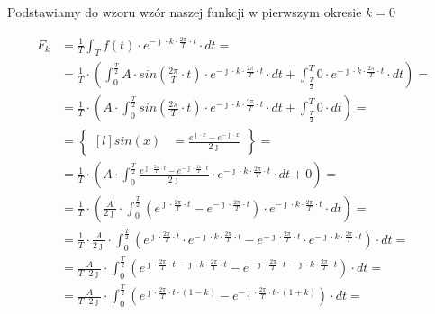 \begin{task}
Podstawiamy do wzoru wzór naszej funkcji w pierwszym okresie $k=0$

\begin{align*}
F_k&=\frac{1}{T}\int_{T}f(t) \cdot e^{-\jmath \cdot k \cdot \frac{2\pi}{T} \cdot t} \cdot dt=\\
&=\frac{1}{T}\cdot\left(\int_{0}^{\frac{T}{2}}A \cdot sin\left( \frac{2\pi}{T} \cdot t\right) \cdot e^{-\jmath \cdot k \cdot \frac{2\pi}{T} \cdot t} \cdot dt+\int_{\frac{T}{2}}^{T} 0 \cdot e^{-\jmath \cdot k \cdot \frac{2\pi}{T} \cdot t} \cdot dt\right)=\\
&=\frac{1}{T}\cdot\left(A \cdot \int_{0}^{\frac{T}{2}}sin\left( \frac{2\pi}{T} \cdot t\right) \cdot e^{-\jmath \cdot k \cdot \frac{2\pi}{T} \cdot t} \cdot dt+\int_{\frac{T}{2}}^{T} 0 \cdot dt\right)=\\
&=\begin{Bmatrix*}[l]
sin\left(x\right)&=\frac{e^{\jmath \cdot x}-e^{-\jmath \cdot x}}{2 \jmath }
\end{Bmatrix*}=\\
&=\frac{1}{T}\cdot\left(A \cdot \int_{0}^{\frac{T}{2}} \frac{e^{\jmath \cdot \frac{2\pi}{T} \cdot t}-e^{-\jmath \cdot \frac{2\pi}{T} \cdot t}}{2\jmath} \cdot e^{-\jmath \cdot k \cdot \frac{2\pi}{T} \cdot t} \cdot dt+0\right)=\\
&=\frac{1}{T}\cdot\left(\frac{A}{2\jmath} \cdot \int_{0}^{\frac{T}{2}} \left(e^{\jmath \cdot \frac{2\pi}{T} \cdot t}-e^{-\jmath \cdot \frac{2\pi}{T} \cdot t}\right)\cdot e^{-\jmath \cdot k \cdot \frac{2\pi}{T} \cdot t} \cdot dt\right)=\\
&=\frac{1}{T} \cdot \frac{A}{2\jmath} \cdot \int_{0}^{\frac{T}{2}}
\left( e^{\jmath \cdot \frac{2\pi}{T} \cdot t} \cdot e^{-\jmath \cdot k \cdot \frac{2\pi}{T} \cdot t} - e^{-\jmath \cdot \frac{2\pi}{T} \cdot t} \cdot e^{-\jmath \cdot k \cdot \frac{2\pi}{T} \cdot t} \right) \cdot dt=\\
&=\frac{A}{T\cdot 2\jmath} \cdot \int_{0}^{\frac{T}{2}}
\left(e^{\jmath \cdot \frac{2\pi}{T} \cdot t -\jmath \cdot k \cdot \frac{2\pi}{T} \cdot t} - e^{-\jmath \cdot \frac{2\pi}{T} \cdot t -\jmath \cdot k \cdot \frac{2\pi}{T} \cdot t} \right) \cdot dt=\\
&=\frac{A}{T\cdot 2\jmath} \cdot \int_{0}^{\frac{T}{2}}
\left(e^{\jmath \cdot \frac{2\pi}{T} \cdot t \cdot \left(1 - k\right)} - e^{-\jmath \cdot \frac{2\pi}{T} \cdot t \cdot \left(1+k\right)} \right) \cdot dt=\\

\end{align*}
\end{task}
